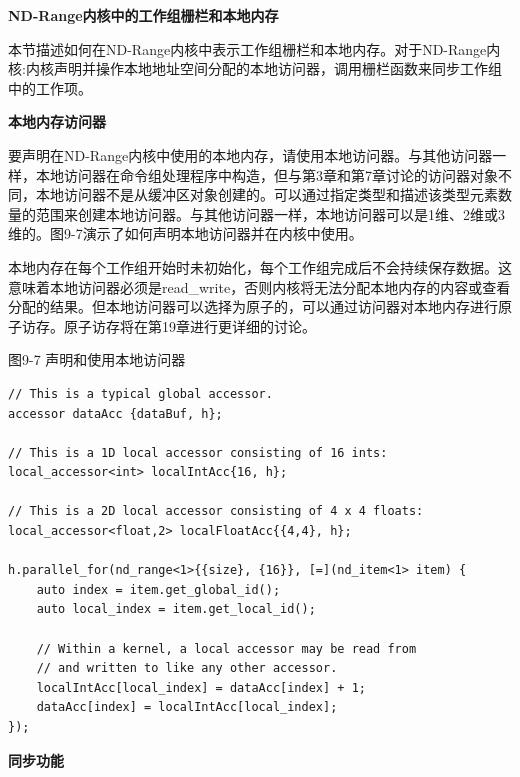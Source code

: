 \hspace*{\fill} \par %
\textbf{ND-Range内核中的工作组栅栏和本地内存}

本节描述如何在ND-Range内核中表示工作组栅栏和本地内存。对于ND-Range内核:内核声明并操作本地地址空间分配的本地访问器，调用栅栏函数来同步工作组中的工作项。\par

\hspace*{\fill} \par %
\textbf{本地内存访问器}

要声明在ND-Range内核中使用的本地内存，请使用本地访问器。与其他访问器一样，本地访问器在命令组处理程序中构造，但与第3章和第7章讨论的访问器对象不同，本地访问器不是从缓冲区对象创建的。可以通过指定类型和描述该类型元素数量的范围来创建本地访问器。与其他访问器一样，本地访问器可以是1维、2维或3维的。图9-7演示了如何声明本地访问器并在内核中使用。\par

本地内存在每个工作组开始时未初始化，每个工作组完成后不会持续保存数据。这意味着本地访问器必须是read\_write，否则内核将无法分配本地内存的内容或查看分配的结果。但本地访问器可以选择为原子的，可以通过访问器对本地内存进行原子访存。原子访存将在第19章进行更详细的讨论。\par

\hspace*{\fill} \par %
图9-7 声明和使用本地访问器
\begin{lstlisting}[caption={}]
// This is a typical global accessor.
accessor dataAcc {dataBuf, h};

// This is a 1D local accessor consisting of 16 ints:
local_accessor<int> localIntAcc{16, h};

// This is a 2D local accessor consisting of 4 x 4 floats:
local_accessor<float,2> localFloatAcc{{4,4}, h};

h.parallel_for(nd_range<1>{{size}, {16}}, [=](nd_item<1> item) {
	auto index = item.get_global_id();
	auto local_index = item.get_local_id();
	
	// Within a kernel, a local accessor may be read from
	// and written to like any other accessor.
	localIntAcc[local_index] = dataAcc[index] + 1;
	dataAcc[index] = localIntAcc[local_index];
});
\end{lstlisting}

\hspace*{\fill} \par %
\textbf{同步功能}

